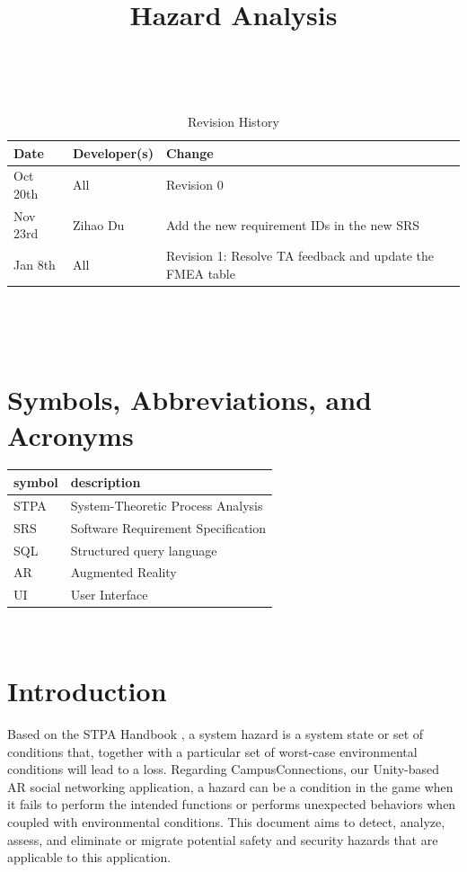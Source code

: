 \documentclass{article}
\title{Hazard Analysis\\\progname}
\author{\authname}
\date{}
\begin{document}
\maketitle
\thispagestyle{empty}

~\newpage


\begin{table}[hp]
\caption{Revision History} \label{TblRevisionHistory}
\begin{tabularx}{\textwidth}{llX}
\toprule
\textbf{Date} & \textbf{Developer(s)} & \textbf{Change}\\
\midrule
Oct 20th & All & Revision 0\\
Nov 23rd & Zihao Du & Add the new requirement IDs in the new SRS\\
Jan 8th & All & Revision 1: Resolve TA feedback and update the FMEA table\\
\bottomrule
\end{tabularx}
\end{table}

~\newpage

\tableofcontents

~\newpage


\section{Symbols, Abbreviations, and Acronyms}

\renewcommand{\arraystretch}{1.2}
\begin{tabular}{l l} 
  \toprule		
  \textbf{symbol} & \textbf{description}\\
  \midrule 
  STPA & System-Theoretic Process Analysis\\
  \midrule
  SRS & Software Requirement Specification\\
  \midrule
  SQL & Structured query language\\
  \midrule
  AR & Augmented Reality\\
  \midrule
  UI & User Interface\\
  \bottomrule
\end{tabular}\\

\section{Introduction}

Based on the STPA Handbook \cite{STPA}, a system hazard is a system state or set of conditions that, together with a particular set of worst-case environmental conditions will lead to a loss. Regarding CampusConnections, our Unity-based AR social networking application, a hazard can be a condition in the game when it fails to perform the intended functions or performs unexpected behaviors when coupled with environmental conditions. This document aims to detect, analyze, assess, and eliminate or migrate potential safety and security hazards that are applicable to this application. 
\end{document}
